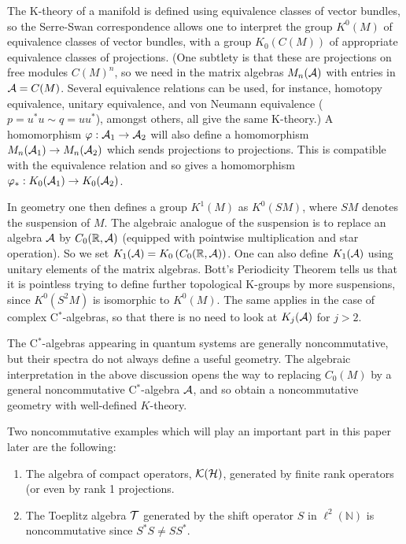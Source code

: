 \documentclass[11pt]{article}
\newcommand{\real}{{\mathbb R}}
\newcommand{\alg}{{\cal A}}
\newcommand{\hilb}{{\cal H}}
\newcommand{\cT}{{\cal T}}
\newcommand{\cpt}{{\cal K}}
\begin{document}
The K-theory of a manifold is defined using equivalence classes of vector bundles, so the Serre-Swan correspondence allows one to interpret the group $K^0(M)$ of equivalence classes of vector bundles, with a group $K_0(C(M))$ of appropriate equivalence classes of projections. 
(One subtlety is that these are projections on free modules $C(M)^n$, so we need in the matrix algebras $M_n(\alg)$ with entries in $\alg = C(M)$. 
Several equivalence relations  can be used, for instance,  homotopy equivalence, unitary equivalence,  and  von Neumann equivalence ($p = u^*u \sim q= uu^*$), amongst others, all give the same K-theory.)
A homomorphism $\varphi: \alg_1 \to \alg_2$ will also define a homomorphism $M_n(\alg_1) \to M_n(\alg_2)$ which sends projections to projections. This is compatible with the equivalence relation and so gives a homomorphism $\varphi_*: K_0(\alg_1) \to K_0(\alg_2)$.

In geometry one then defines a group $K^1(M)$ as $K^0(SM)$, where $SM$ denotes the suspension of $M$.
The algebraic analogue of the suspension is to replace an algebra $\alg$ by $C_0(\real,\alg)$ (equipped with pointwise multiplication and star operation).
So we set $K_1(\alg) = K_0\left(C_0(\real,\alg)\right)$. One can also define $K_1(\alg)$ using unitary elements of the matrix algebras. 
Bott's Periodicity Theorem tells us that it is pointless trying to define further topological K-groups by more suspensions, since $K^0(S^2M)$  is isomorphic to $K^0(M)$. The same applies in the case of complex C$^*$-algebras, so that there is no need to look at $K_j(\alg)$ for $j>2$.

The  C$^*$-algebras appearing in quantum systems are generally noncommutative, but  their spectra do not always define a useful  geometry. 
The algebraic interpretation in the above discussion opens the way to replacing $C_0(M)$ by a general noncommutative C$^*$-algebra $\alg$, and so obtain a noncommutative geometry with well-defined  $K$-theory.

Two noncommutative examples which will play an important part in this paper later are the following:
\begin{enumerate}
\item
The algebra of compact operators, $\cpt(\hilb)$, generated by finite rank operators (or even by rank 1 projections.
\item
The Toeplitz algebra $\cT$  generated by the shift operator $S$ in $\ell^2({\mathbb N})$ is noncommutative since $S^*S \neq SS^*$.
\end{enumerate}
\end{document}

